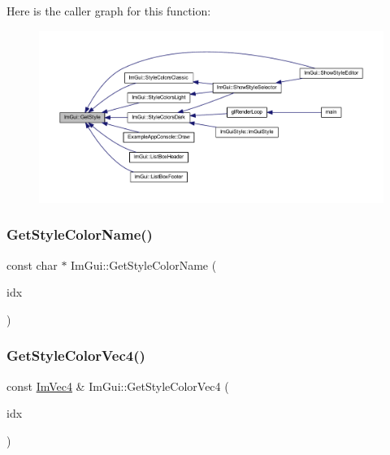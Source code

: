 Here is the caller graph for this function\+:
\nopagebreak
\begin{figure}[H]
\begin{center}
\leavevmode
\includegraphics[width=350pt]{namespace_im_gui_abafef4bb3e3654efd96a47b2e22870a7_icgraph}
\end{center}
\end{figure}
\mbox{\label{namespace_im_gui_a265d7614c4c0b92ba6dd43946a3293e0}} 
\subsubsection{\texorpdfstring{Get\+Style\+Color\+Name()}{GetStyleColorName()}}
{\footnotesize\ttfamily const char $\ast$ Im\+Gui\+::\+Get\+Style\+Color\+Name (\begin{DoxyParamCaption}\item[{\mbox{\hyperlink{imgui_8h_a1b0467ec582e731ae6292fef726fb5fe}{Im\+Gui\+Col}}}]{idx }\end{DoxyParamCaption})}

\mbox{\label{namespace_im_gui_ad838e580972e2c4b3da2b0f60754b662}} 
\subsubsection{\texorpdfstring{Get\+Style\+Color\+Vec4()}{GetStyleColorVec4()}}
{\footnotesize\ttfamily const \mbox{\hyperlink{struct_im_vec4}{Im\+Vec4}} \& Im\+Gui\+::\+Get\+Style\+Color\+Vec4 (\begin{DoxyParamCaption}\item[{\mbox{\hyperlink{imgui_8h_a1b0467ec582e731ae6292fef726fb5fe}{Im\+Gui\+Col}}}]{idx }\end{DoxyParamCaption})}

